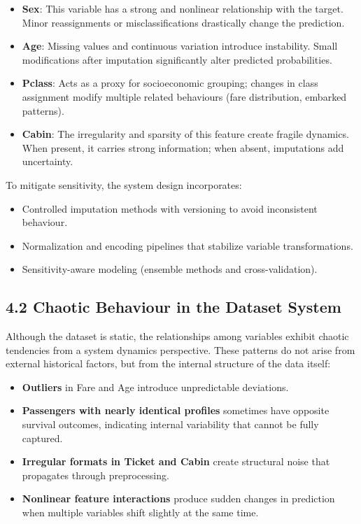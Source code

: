 \documentclass[12pt]{report}
\begin{document}
\begin{itemize}
    \item \textbf{Sex}: This variable has a strong and nonlinear relationship with the target. 
    Minor reassignments or misclassifications drastically change the prediction.
    
    \item \textbf{Age}: Missing values and continuous variation introduce instability. 
    Small modifications after imputation significantly alter predicted probabilities.
    
    \item \textbf{Pclass}: Acts as a proxy for socioeconomic grouping; changes in class 
    assignment modify multiple related behaviours (fare distribution, embarked patterns).
    
    \item \textbf{Cabin}: The irregularity and sparsity of this feature create fragile dynamics. 
    When present, it carries strong information; when absent, imputations add uncertainty.
\end{itemize}

To mitigate sensitivity, the system design incorporates:
\begin{itemize}
    \item Controlled imputation methods with versioning to avoid inconsistent behaviour.
    \item Normalization and encoding pipelines that stabilize variable transformations.
    \item Sensitivity-aware modeling (ensemble methods and cross-validation).
\end{itemize}

\subsection*{4.2 Chaotic Behaviour in the Dataset System}

Although the dataset is static, the relationships among variables exhibit chaotic tendencies 
from a system dynamics perspective. These patterns do not arise from external historical 
factors, but from the internal structure of the data itself:

\begin{itemize}
    \item \textbf{Outliers} in Fare and Age introduce unpredictable deviations.
    \item \textbf{Passengers with nearly identical profiles} sometimes have opposite 
    survival outcomes, indicating internal variability that cannot be fully captured.
    \item \textbf{Irregular formats in Ticket and Cabin} create structural noise that 
    propagates through preprocessing.
    \item \textbf{Nonlinear feature interactions} produce sudden changes in prediction 
    when multiple variables shift slightly at the same time.
\end{itemize}
\end{document}
